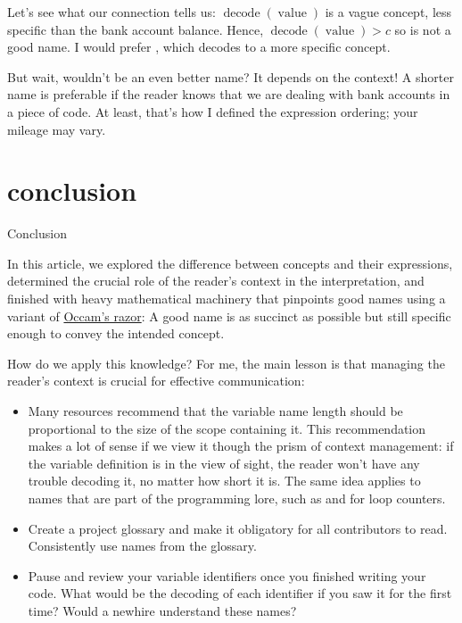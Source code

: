 \documentclass{article}
\begin{document}
Let's see what our connection tells us:
$\operatorname{decode}(\operatorname{value})$
is a vague concept,
less specific than the bank account balance.
Hence,
$\operatorname{decode}(\operatorname{value}) > c$
so  is not a good name.
I would prefer , which decodes to a more specific concept.

But wait, wouldn't  be an even better name?
It depends on the context!
A shorter name is preferable if the reader knows that we are dealing with bank accounts in a piece of code.
At least, that's how I defined the expression ordering; your mileage may vary.

\section{conclusion}{Conclusion}

In this article, we explored the difference between concepts and their expressions,
determined the crucial role of the reader's context in the interpretation,
and finished with heavy mathematical machinery that pinpoints good names using a variant of \href{https://en.wikipedia.org/wiki/Occam's_razor}{Occam's razor}:
A good name is as succinct as possible but still specific enough to convey the intended concept.

How do we apply this knowledge?
For me, the main lesson is that managing the reader's context is crucial for effective communication:

\begin{itemize}
\item
  Many resources recommend that the variable name length should be proportional to the size of the scope containing it.
  This recommendation makes a lot of sense if we view it though the prism of context management: if the variable definition is in the view of sight, the reader won't have any trouble decoding it, no matter how short it is.
  The same idea applies to names that are part of the programming lore, such as  and  for loop counters.
\item
  Create a project glossary and make it obligatory for all contributors to read.
  Consistently use names from the glossary.
\item
  Pause and review your variable identifiers once you finished writing your code.
  What would be the decoding of each identifier if you saw it for the first time?
  Would a newhire understand these names?
\end{itemize}
\end{document}
